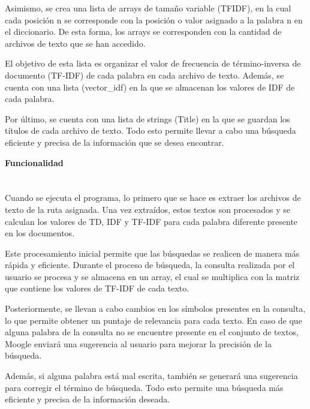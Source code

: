 \documentclass{article}
\begin{document}
Asimismo, se crea una lista de arrays de tamaño variable (TFIDF), en la cual cada posición n se corresponde con la posición o valor asignado a la palabra n en el diccionario. De esta forma, los arrays se corresponden con la cantidad de archivos de texto que se han accedido.

El objetivo de esta lista es organizar el valor de frecuencia de término-inversa de documento (TF-IDF) de cada palabra en cada archivo de texto. Además, se cuenta con una lista (vector\_{}idf) en la que se almacenan los valores de IDF de cada palabra.

Por último, se cuenta con una lista de strings (Title) en la que se guardan los títulos de cada archivo de texto. Todo esto permite llevar a cabo una búsqueda eficiente y precisa de la información que se desea encontrar.

\begin{center}
    \fontsize{14}{20}\selectfont
    \textbf{Funcionalidad }
\end{center}
\section*{ }
Cuando se ejecuta el programa, lo primero que se hace es extraer los archivos de texto de la ruta asignada. Una vez extraídos, estos textos son procesados y se calculan los valores de TD, IDF y TF-IDF para cada palabra diferente presente en los documentos.

Este procesamiento inicial permite que las búsquedas se realicen de manera más rápida y eficiente. Durante el proceso de búsqueda, la consulta realizada por el usuario se procesa y se almacena en un array, el cual se multiplica con la matriz que contiene los valores de TF-IDF de cada texto.

Posteriormente, se llevan a cabo cambios en los símbolos presentes en la consulta, lo que permite obtener un puntaje de relevancia para cada texto. En caso de que alguna palabra de la consulta no se encuentre presente en el conjunto de textos, Moogle enviará una sugerencia al usuario para mejorar la precisión de la búsqueda.

Además, si alguna palabra está mal escrita, también se generará una sugerencia para corregir el término de búsqueda. Todo esto permite una búsqueda más eficiente y precisa de la información deseada.
\end{document}

